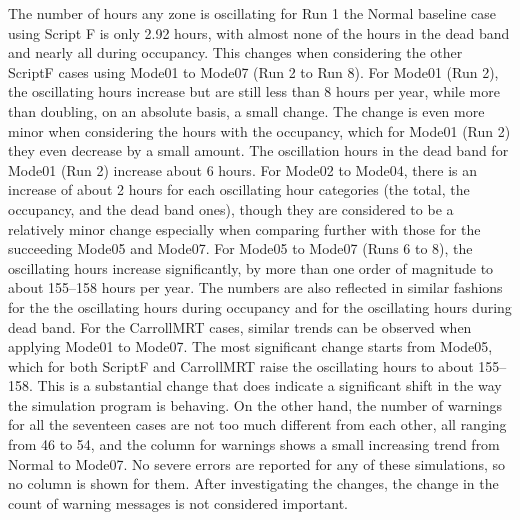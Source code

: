 The number of hours any zone is oscillating for Run 1 the Normal baseline case using Script F is only 2.92 hours, with almost none of the hours in the dead band and nearly all during occupancy. This changes when considering the other ScriptF cases using Mode01 to Mode07 (Run 2 to Run 8).  For Mode01 (Run 2), the oscillating hours increase but are still less than 8 hours per year, while more than doubling, on an absolute basis, a small change. The change is even more minor when considering the hours with the occupancy, which for Mode01 (Run 2) they even decrease by a small amount. The oscillation hours in the dead band for Mode01 (Run 2) increase about 6 hours. For Mode02 to Mode04, there is an increase of about 2 hours for each oscillating hour categories (the total, the occupancy, and the dead band ones), though they are considered to be a relatively minor change especially when comparing further with those for the succeeding Mode05 and Mode07.  For Mode05 to Mode07 (Runs 6 to 8), the oscillating hours increase significantly, by more than one order of magnitude to about 155--158 hours per year. The numbers are also reflected in similar fashions for the the oscillating hours during occupancy and for the oscillating hours during dead band.  For the CarrollMRT cases, similar trends can be observed when applying Mode01 to Mode07.  The most significant change starts from Mode05, which for both ScriptF and CarrollMRT raise the oscillating hours to about 155--158. This is a substantial change that does indicate a significant shift in the way the simulation program is behaving.  On the other hand, the number of warnings for all the seventeen cases are not too much different from each other, all ranging from 46 to 54, and the column for warnings shows a small increasing trend from Normal to Mode07. No severe errors are reported for any of these simulations, so no column is shown for them. After investigating the changes, the change in the count of warning messages is not considered important.

